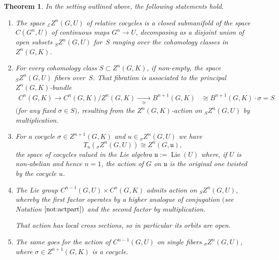 \documentclass[10pt,a4paper]{amsart}
\numberwithin{equation}{section}
\newtheorem*{Theorem*}{Theorem}
\newcommand\cE{{\mathcal E}}
\newcommand\fu{{\mathfrak u}}
\begin{document}
\begin{Theorem*}
 In the setting outlined above, the following statements hold.
 \begin{enumerate}[$(a)$]\itemsep=0pt



 \item The space ${}_{\cE}Z^n(G,U)$ of relative cocycles is a closed submanifold of the space $C(G^n,U)$ of continuous maps $G^n\to U$, decomposing as a disjoint union of open subsets ${}_S Z^n(G,U)$ for~$S$ ranging over the cohomology classes in $Z^n(G,K)$.


 \item\label{item:12} For every cohomology class $S\subset Z^n(G,K)$, if non-empty, the space ${}_S Z^{n}(G,U)$ fibers over~$S$. That fibration is associated to the principal $Z^n(G,K)$-bundle
 \begin{align*}
 C^n(G,K) \xrightarrow{\quad}
 C^n(G,K)/Z^n(G,K) \xrightarrow[\quad\cong\quad]{}
 B^{n+1}(G,K) &\cong B^{n+1}(G,K)\cdot \sigma=S
 \end{align*}
 $($for any fixed $\sigma\in S)$, resulting from the $Z^n(G,K)$-action on ${}_SZ^n(G,U)$ by multiplication.


 \item For a cocycle $\sigma\in Z^{n+1}(G,K)$ and $u\in {}_{\sigma}Z^n(G,U)$ we have
 \begin{equation*}
 T_u \left({}_{\sigma}Z^n(G,U)\right)
 \cong
 Z^n(G,\fu),
 \end{equation*}
 the space of cocycles valued in the Lie algebra $\fu:=\operatorname{Lie}(U)$ where, if $U$ is non-abelian and hence $n=1$, the action of $G$ on $\fu$ is the original one twisted by the cocycle $u$.

 \item The Lie group $C^{n-1}(G,U)\times C^n(G,K)$ admits action on ${}_S Z^n(G,U)$, whereby the first factor operates by a higher analogue of conjugation $($see Notation $\ref{not:actpart})$ and the second factor by multiplication.

 That action has local cross sections, so in particular its orbits are open.

 \item\label{item:13} The same goes for the action of $C^{n-1}(G,U)$ on single fibers ${}_{\sigma}Z^n(G,U)$, where $\sigma\!\!\in\!\! Z^{n+1}(G,K)$ is a cocycle.
 \end{enumerate}
\end{Theorem*}
\end{document}
